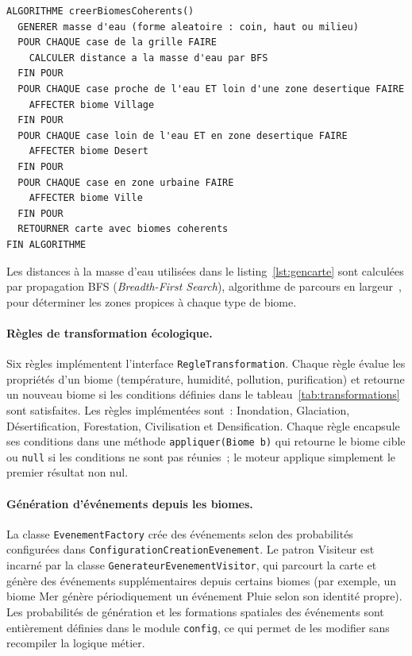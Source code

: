 \begin{lstlisting}[style=algo, label=lst:gencarte,
    caption={Pseudo-code de la génération cohérente de la carte}]
ALGORITHME creerBiomesCoherents()
  GENERER masse d'eau (forme aleatoire : coin, haut ou milieu)
  POUR CHAQUE case de la grille FAIRE
    CALCULER distance a la masse d'eau par BFS
  FIN POUR
  POUR CHAQUE case proche de l'eau ET loin d'une zone desertique FAIRE
    AFFECTER biome Village
  FIN POUR
  POUR CHAQUE case loin de l'eau ET en zone desertique FAIRE
    AFFECTER biome Desert
  FIN POUR
  POUR CHAQUE case en zone urbaine FAIRE
    AFFECTER biome Ville
  FIN POUR
  RETOURNER carte avec biomes coherents
FIN ALGORITHME
\end{lstlisting}

Les distances à la masse d'eau utilisées dans le listing~\ref{lst:gencarte} sont
calculées par propagation BFS (\textit{Breadth-First Search}), algorithme de
parcours en largeur~\cite{cormen2009intro}, pour déterminer les zones propices à
chaque type de biome.

\paragraph{Règles de transformation écologique.}
Six règles implémentent l'interface \texttt{RegleTransformation}. Chaque règle
évalue les propriétés d'un biome (température, humidité, pollution, purification)
et retourne un nouveau biome si les conditions définies dans le
tableau~\ref{tab:transformations} sont satisfaites. Les règles implémentées
sont~: Inondation, Glaciation, Désertification, Forestation, Civilisation et
Densification. Chaque règle encapsule ses conditions dans une méthode
\texttt{appliquer(Biome b)} qui retourne le biome cible ou \texttt{null} si les
conditions ne sont pas réunies~; le moteur applique simplement le premier résultat
non nul.

\paragraph{Génération d'événements depuis les biomes.}
La classe \texttt{EvenementFactory} crée des événements selon des probabilités
configurées dans \texttt{Configuration\allowbreak Creation\allowbreak Evenement}. Le patron Visiteur est
incarné par la classe \texttt{GenerateurEvenementVisitor}, qui parcourt la carte et
génère des événements supplémentaires depuis certains biomes (par exemple, un biome
Mer génère périodiquement un événement Pluie selon son identité propre). Les
probabilités de génération et les formations spatiales des événements sont
entièrement définies dans le module \texttt{config}, ce qui permet de les modifier
sans recompiler la logique métier.

